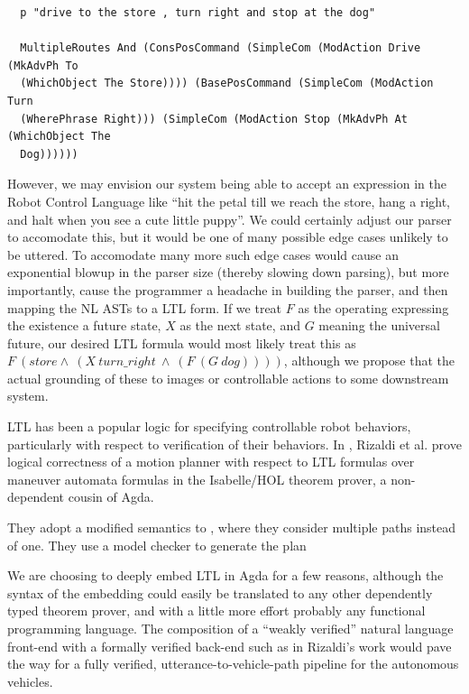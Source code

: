 \documentclass{article}
\begin{document}
\begin{verbatim}
  p "drive to the store , turn right and stop at the dog"

  MultipleRoutes And (ConsPosCommand (SimpleCom (ModAction Drive (MkAdvPh To
  (WhichObject The Store)))) (BasePosCommand (SimpleCom (ModAction Turn
  (WherePhrase Right))) (SimpleCom (ModAction Stop (MkAdvPh At (WhichObject The
  Dog))))))
\end{verbatim}

However, we may envision our system being able to accept an expression in the
Robot Control Language like ``hit the petal till we reach the store, hang a
right, and halt when you see a cute little puppy''. We could certainly adjust
our parser to accomodate this, but it would be one of many possible edge cases
unlikely to be uttered. To accomodate many more such edge cases would cause an
exponential blowup in the parser size (thereby slowing down parsing), but more
importantly, cause the programmer a headache in building the parser, and then
mapping the NL ASTs to a LTL form. If we treat $F$ as the operating
expressing the existence a future state, $X$ as the next state, and $G$ meaning
the universal future, our desired LTL formula would most likely treat this as
$F\ (store \land\ (X\ turn\_right\ \land\ (F\ (G\ dog))))$, although we propose
that the actual grounding of these to images or controllable actions to some
downstream system.

LTL has been a popular logic for specifying controllable robot behaviors,
particularly with respect to verification of their behaviors. In
\cite{verifiedMotion}, Rizaldi et al. prove logical correctness of a motion
planner with respect to LTL formulas over maneuver automata formulas in the
Isabelle/HOL theorem prover, a non-dependent cousin of Agda.

They adopt a
modified semantics to \cite{fainekos2005temporal}, where they consider multiple
paths instead of one. They use a model checker to generate the plan

We are choosing to
deeply embed LTL in Agda for a few reasons, although the syntax of the embedding
could easily be translated to any other dependently typed theorem prover, and
with a little more effort probably any functional programming language. The
composition of a ``weakly verified'' natural language front-end with a formally
verified back-end such as in Rizaldi's work would pave the way for a fully
verified, utterance-to-vehicle-path pipeline for the autonomous vehicles.
\end{document}
